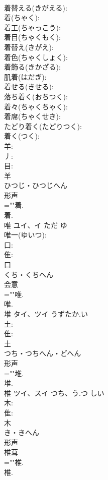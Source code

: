 \documentclass[8pt]{extreport}
\begin{document}
\begin{CJK}{UTF8}{min}
\\	着替える(きがえる): 
\\	着(ちゃく): 
\\	着工(ちゃっこう): 
\\	着目(ちゃくもく): 
\\	着替え(きがえ): 
\\	着色(ちゃくしょく): 
\\	着飾る(きかざる): 
\\	肌着(はだぎ): 
\\	着せる(きせる): 
\\	落ち着く(おちつく): 
\\	着々(ちゃくちゃく): 
\\	着席(ちゃくせき): 
\\	たどり着く(たどりつく): 
\\	着く(つく): 
\\	羊: 
\\	丿: 
\\	目: 
\\	羊	
\\	ひつじ・ひつじへん	
\\	形声 
\\	=""着.
\\	着.
\\	唯	ユイ、イ	ただ	ゆ	
\\	唯一(ゆいつ): 
\\	口: 
\\	隹: 
\\	口	
\\	くち・くちへん	
\\	会意 
\\	=""唯.
\\	唯.
\\	堆	タイ、ツイ	うずたか.い		
\\	土: 
\\	隹: 
\\	土	
\\	つち・つちへん・どへん	
\\	形声 
\\	=""堆.
\\	堆.
\\	椎	ツイ、スイ	つち、う.つ	しい	
\\	木: 
\\	隹: 
\\	木	
\\	き・きへん	
\\	形声 
\\	椎茸 
\\	=""椎.
\\	椎.

\end{CJK}
\end{document}
